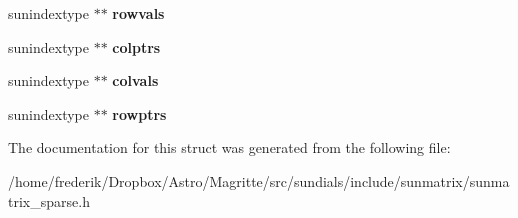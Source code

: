 \begin{DoxyCompactItemize}
\item 
\mbox{\label{struct__SUNMatrixContent__Sparse_aa3d710b6a92d7475589e73f6757e2ee9}} 
sunindextype $\ast$$\ast$ {\bfseries rowvals}
\item 
\mbox{\label{struct__SUNMatrixContent__Sparse_a8cd7e8d8439cf4271083d4c6b83e5d78}} 
sunindextype $\ast$$\ast$ {\bfseries colptrs}
\item 
\mbox{\label{struct__SUNMatrixContent__Sparse_aab3c930a4955eaeceab92494ab9771f7}} 
sunindextype $\ast$$\ast$ {\bfseries colvals}
\item 
\mbox{\label{struct__SUNMatrixContent__Sparse_a868993658858e83dde3372decf08f81d}} 
sunindextype $\ast$$\ast$ {\bfseries rowptrs}
\end{DoxyCompactItemize}


The documentation for this struct was generated from the following file\+:\begin{DoxyCompactItemize}
\item 
/home/frederik/\+Dropbox/\+Astro/\+Magritte/src/sundials/include/sunmatrix/sunmatrix\+\_\+sparse.\+h\end{DoxyCompactItemize}
